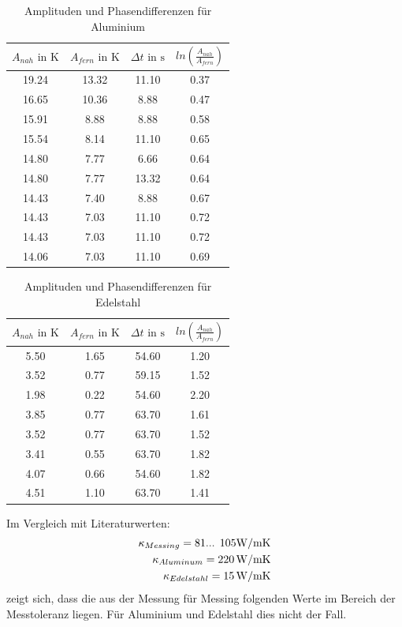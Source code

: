 \begin{table}[b]
  \centering
  \caption{Amplituden und Phasendifferenzen für Aluminium}
  \label{tab:Alu}
  \begin{tabular}{c c c c}
    \toprule
    $A_{nah} \text{ in } \si{\kelvin}$ & $A_{fern} \text{ in } \si{\kelvin}$ & $\Delta t \text{ in } \si{\second}$ & $ ln(\frac{A_{nah}}{A_{fern}}) $ \\
    \midrule
    19.24 & 13.32 & 11.10 & 0.37 \\
    16.65 & 10.36 & 8.88 & 0.47 \\
    15.91 & 8.88 & 8.88 & 0.58 \\
    15.54 & 8.14 & 11.10 & 0.65 \\
    14.80 & 7.77 & 6.66 & 0.64 \\
    14.80 & 7.77 & 13.32 & 0.64 \\
    14.43 & 7.40 & 8.88 & 0.67 \\
    14.43 & 7.03 & 11.10 & 0.72 \\
    14.43 & 7.03 & 11.10 & 0.72 \\
    14.06 & 7.03 & 11.10 & 0.69 \\
    \bottomrule
  \end{tabular}
\end{table}

\begin{table}[b]
  \centering
  \caption{Amplituden und Phasendifferenzen für Edelstahl}
  \label{tab:Edelstahl}
  \begin{tabular}{c c c c}
    \toprule
    $A_{nah} \text{ in } \si{\kelvin}$ & $A_{fern} \text{ in } \si{\kelvin}$ & $\Delta t \text{ in } \si{\second}$ & $ln(\frac{A_{nah}}{A_{fern}})$\\
    \midrule
    5.50 & 1.65 & 54.60 & 1.20 \\
    3.52 & 0.77 & 59.15 & 1.52 \\
    1.98 & 0.22 & 54.60 & 2.20 \\
    3.85 & 0.77 & 63.70 & 1.61 \\
    3.52 & 0.77 & 63.70 & 1.52 \\
    3.41 & 0.55 & 63.70 & 1.82 \\
    4.07 & 0.66 & 54.60 & 1.82 \\
    4.51 & 1.10 & 63.70 & 1.41 \\
    \bottomrule
  \end{tabular}
\end{table}

Im Vergleich mit Literaturwerten:
\begin{equation*}
  \begin{split}
    \kappa_{Messing} = \num{81}\text{... }\num{105}\si{\watt\per{\metre\kelvin}} \\
    \kappa_{Aluminum} = \SI{220}{\watt\per{\metre\kelvin}} \\
    \kappa_{Edelstahl} = \SI{15}{\watt\per{\metre\kelvin}}
  \end{split}
\end{equation*}
zeigt sich, dass die aus der Messung für Messing folgenden Werte im Bereich der Messtoleranz liegen. Für Aluminium und Edelstahl dies nicht der Fall.

